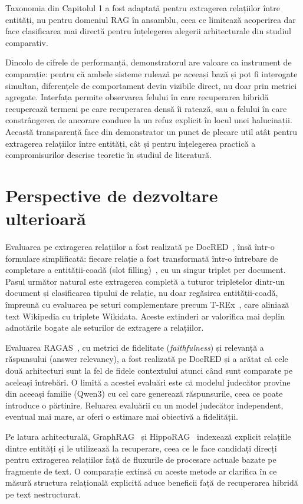 Taxonomia din Capitolul 1 a fost adaptată pentru extragerea relațiilor între entități, nu pentru domeniul RAG în ansamblu, ceea ce limitează acoperirea dar face clasificarea mai directă pentru înțelegerea alegerii arhitecturale din studiul comparativ.

Dincolo de cifrele de performanță, demonstratorul are valoare ca instrument de comparație: pentru că ambele sisteme rulează pe aceeași bază și pot fi interogate simultan, diferențele de comportament devin vizibile direct, nu doar prin metrici agregate. Interfața permite observarea felului în care recuperarea hibridă recuperează termeni pe care recuperarea densă îi ratează, sau a felului în care constrângerea de ancorare conduce la un refuz explicit în locul unei halucinații. Această transparență face din demonstrator un punct de plecare util atât pentru extragerea relațiilor între entități, cât și pentru înțelegerea practică a compromisurilor descrise teoretic în studiul de literatură.

\section*{Perspective de dezvoltare ulterioară}

Evaluarea pe extragerea relațiilor a fost realizată pe DocRED~\cite{yao2019docred}, însă într-o formulare simplificată: fiecare relație a fost transformată într-o întrebare de completare a entității-coadă (slot filling)~\cite{levy2017zeroshot}, cu un singur triplet per document. Pasul următor natural este extragerea completă a tuturor tripletelor dintr-un document și clasificarea tipului de relație, nu doar regăsirea entității-coadă, împreună cu evaluarea pe seturi complementare precum T-REx~\cite{elsahar2018trex}, care aliniază text Wikipedia cu triplete Wikidata. Aceste extinderi ar valorifica mai deplin adnotările bogate ale seturilor de extragere a relațiilor.

Evaluarea RAGAS~\cite{es2024ragas}, cu metrici de fidelitate (\textit{faithfulness}) și relevanță a răspunsului (answer relevancy), a fost realizată pe DocRED și a arătat că cele două arhitecturi sunt la fel de fidele contextului atunci când sunt comparate pe aceleași întrebări. O limită a acestei evaluări este că modelul judecător provine din aceeași familie (Qwen3) cu cel care generează răspunsurile, ceea ce poate introduce o părtinire. Reluarea evaluării cu un model judecător independent, eventual mai mare, ar oferi o estimare mai obiectivă a fidelității.

Pe latura arhitecturală, GraphRAG~\cite{edge2024graphrag} și HippoRAG~\cite{gutierrez2024hipporag} indexează explicit relațiile dintre entități și le utilizează la recuperare, ceea ce le face candidați direcți pentru extragerea relațiilor față de fluxurile de procesare actuale bazate pe fragmente de text. O comparație extinsă cu aceste metode ar clarifica în ce măsură structura relațională explicită aduce beneficii față de recuperarea hibridă pe text nestructurat.

